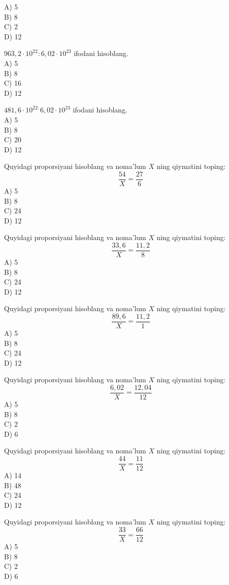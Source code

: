 A) 5\\
B) 8\\
C) 2\\ 
D) 12
  \item $963,2 \cdot 10^{22}: 6,02 \cdot 10^{23}$ ifodani hisoblang.\\
A) 5\\
B) 8\\
C) 16\\
D) 12
  \item $481,6 \cdot 10^{22:} 6,02 \cdot 10^{23}$ ifodani hisoblang.\\
A) 5\\
B) 8\\
C) 20\\
D) 12
 \item Quyidagi proporsiyani hisoblang va noma'lum $X$ ning qiymatini toping:
\[
\frac{54}{X} = \frac{27}{6}
\]
A) 5 \\ 
B) 8 \\ 
C) 24 \\ 
D) 12
\item Quyidagi proporsiyani hisoblang va noma'lum $X$ ning qiymatini toping:
\[
\frac{33{,}6}{X} = \frac{11{,}2}{8}
\]
A) 5 \\ 
B) 8 \\ 
C) 24 \\ 
D) 12
\item Quyidagi proporsiyani hisoblang va noma'lum $X$ ning qiymatini toping:
\[
\frac{89{,}6}{X} = \frac{11{,}2}{1}
\]
A) 5 \\ 
B) 8 \\ 
C) 24 \\ 
D) 12
\item Quyidagi proporsiyani hisoblang va noma'lum $X$ ning qiymatini toping:
\[
\frac{6{,}02}{X} = \frac{12{,}04}{12}
\]
A) 5 \\ 
B) 8 \\ 
C) 2 \\ 
D) 6
\item Quyidagi proporsiyani hisoblang va noma'lum $X$ ning qiymatini toping:
\[
\frac{44}{X} = \frac{11}{12}
\]
A) 14 \\ 
B) 48 \\ 
C) 24 \\ 
D) 12
\item Quyidagi proporsiyani hisoblang va noma'lum $X$ ning qiymatini toping:
\[
\frac{33}{X} = \frac{66}{12}
\]
A) 5 \\ 
B) 8 \\ 
C) 2 \\ 
D) 6
